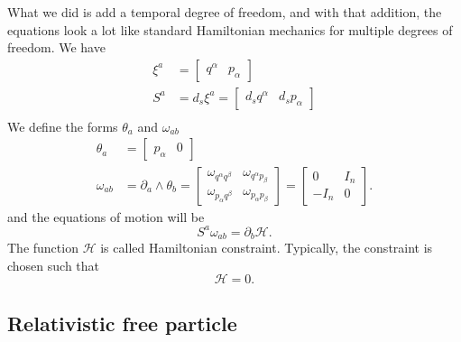 What we did is add a temporal degree of freedom, and with that addition, the equations look a lot like standard Hamiltonian mechanics for multiple degrees of freedom. We have
\begin{equation}
	\begin{aligned}
		\xi^a &= \begin{bmatrix}
			q^\alpha & p_\alpha 
		\end{bmatrix} \\
		S^a &= d_s \xi^a = \begin{bmatrix}
			d_s q^\alpha & d_s p_\alpha
		\end{bmatrix} \\
	\end{aligned}
\end{equation}
We define the forms $\theta_a$ and $\omega_{ab}$
\begin{equation}\label{rp-cm-rel-symplecticForm}
	\tag{SF-FE}
	\begin{aligned}
		\theta_a &= \begin{bmatrix}
	p_\alpha & 0 
\end{bmatrix} \\
	\omega_{ab} &= \partial_a \wedge \theta_b = \left[\begin{array}{cc}
		\omega_{q^\alpha q^\beta} & \omega_{q^\alpha p_\beta} \\
		\omega_{p_\alpha q^\beta} & \omega_{p_\alpha p_\beta} 
	\end{array} \right]= \left[\begin{array}{cc}
		0 & I_n \\
		- I_n & 0 
	\end{array} \right].
	\end{aligned}
\end{equation}
and the equations of motion will be
\begin{equation}
	S^a \omega_{ab} = \partial_b \mathcal{H}.
\end{equation}
The function $\mathcal{H}$ is called Hamiltonian constraint. Typically, the constraint is chosen such that
\begin{equation}
	\mathcal{H}=0.
\end{equation}

\subsection{Relativistic free particle}

